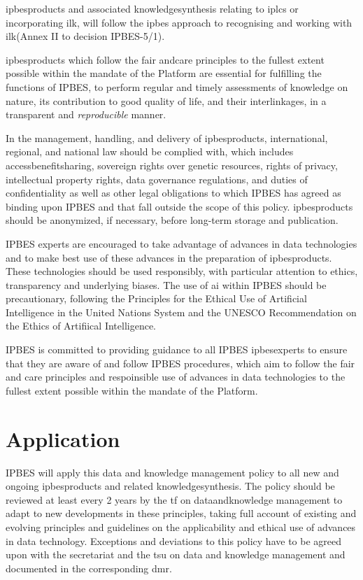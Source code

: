 \documentclass{article}
\begin{document}
\glspl{ipbesproduct} and associated \gls{knowledgesynthesis} relating to \glspl{iplc} or incorporating \gls{ilk}, will follow the \gls{ipbes} approach to recognising and working with \gls{ilk}(Annex II to decision IPBES-5/1).

\glspl{ipbesproduct} which follow the \gls{fair} and\gls{care} principles to the fullest extent possible within the mandate of the Platform are essential for fulfilling the functions of IPBES, to perform regular and timely assessments of \gls{knowledge} on nature, its contribution to good quality of life, and their interlinkages, in a transparent and \textit{reproducible} manner.

In the management, handling, and delivery of \glspl{ipbesproduct}, international, regional, and national law should be complied with, which includes \gls{accessbenefitsharing}, sovereign rights over genetic resources, rights of privacy, intellectual property rights, \gls{data} governance regulations, and duties of confidentiality as well as other legal obligations to which IPBES has agreed as binding upon IPBES and that fall outside the scope of this policy. \glspl{ipbesproduct} should be anonymized, if necessary, before long-term storage and publication.

IPBES experts are encouraged to take advantage of advances in \gls{data} technologies and to make best use of these advances in the preparation of \glspl{ipbesproduct}. These technologies should be used responsibly, with particular attention to ethics, transparency and underlying biases. The use of \gls{ai} within IPBES should be precautionary, following the Principles for the Ethical Use of Artificial Intelligence in the United Nations System and the UNESCO Recommendation on the Ethics of Artifiical Intelligence.

IPBES is committed to providing guidance to all IPBES \glspl{ipbesexpert} to ensure that they are aware of and follow IPBES procedures, which aim to follow the \gls{fair} and \gls{care} principles and respoinsible use of advances in \gls{data} technologies to the fullest extent possible within the mandate of the Platform.

\section{Application}

IPBES will apply this \gls{data} and \gls{knowledge} management policy to all new and ongoing \glspl{ipbesproduct} and related \gls{knowledgesynthesis}. The policy should be reviewed at least every 2 years by the \gls{tf} on \gls{dataandknowledge} management to adapt to new developments in these principles, taking full account of existing and evolving principles and guidelines on the applicability and ethical use of advances in \gls{data} technology. Exceptions and deviations to this policy have to be agreed upon with the \gls{secretariat} and the  \gls{tsu} on \gls{data} and \gls{knowledge} management and documented in the corresponding \gls{dmr}.
\end{document}
